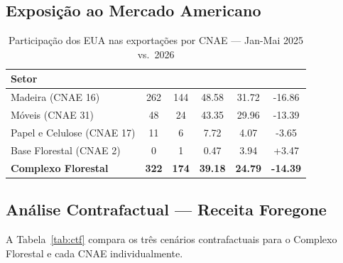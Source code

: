 \documentclass[12pt, a4paper]{article}
\begin{document}
\subsection{Exposição ao Mercado Americano}

\begin{table}[H]
  \centering
  \caption{Participação dos EUA nas exportações por CNAE — Jan-Mai 2025 vs.\ 2026}
  \label{tab:share}
  \renewcommand{\arraystretch}{1.35}
  \small
  \begin{tabular}{lS[table-format=3.0]S[table-format=3.0]S[table-format=2.2]S[table-format=2.2]S[table-format=-2.2]}
    \toprule
    \textbf{Setor}
      & \textbf{}
      & \textbf{}
      & \textbf{}
      & \textbf{}
      & \textbf{} \\
    \midrule
    Madeira (CNAE 16)          & 262 & 144 & 48.58 & 31.72 & -16.86 \\
    Móveis (CNAE 31)           &  48 &  24 & 43.35 & 29.96 & -13.39 \\
    Papel e Celulose (CNAE 17) &  11 &   6 &  7.72 &  4.07 &  -3.65 \\
    Base Florestal (CNAE 2)    &   0 &   1 &  0.47 &  3.94 &  +3.47 \\
    \midrule
    \textbf{Complexo Florestal}& \textbf{322} & \textbf{174}
      & \textbf{39.18} & \textbf{24.79} & \textbf{-14.39} \\
    \bottomrule
  \end{tabular}
\end{table}

\subsection{Análise Contrafactual — Receita Foregone}

A Tabela~\ref{tab:ctf} compara os três cenários contrafactuais para o
Complexo Florestal e cada CNAE individualmente.
\end{document}
